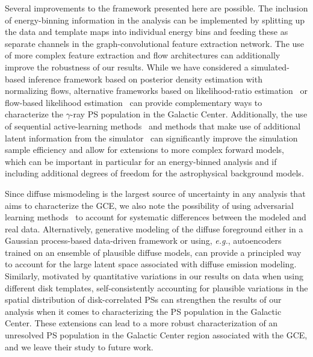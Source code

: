 \documentclass[prd,aps,10pt,nofootinbib,twocolumn,superscriptaddress,preprintnumbers,balancelastpage,longbibliography]{revtex4-1}
\begin{document}
Several improvements to the framework presented here are possible. The inclusion of energy-binning information in the analysis can be implemented by splitting up the data and template maps into individual energy bins and feeding these as separate channels in the graph-convolutional feature extraction network. The use of more complex feature extraction and flow architectures can additionally improve the robustness of our results. 
While we have considered a simulated-based inference framework based on posterior density estimation with normalizing flows, alternative frameworks based on likelihood-ratio estimation~\cite{Brehmer:2018eca,Brehmer:2018hga,Brehmer:2018kdj,Cranmer:2015bka, Hermans:2019ioj,Miller:2020hua,Miller:2021hys} or flow-based likelihood estimation~\cite{winkler2019learning,papamakarios2019sequential} can provide complementary ways to characterize the $\gamma$-ray PS population in the Galactic Center. Additionally, the use of sequential active-learning methods~\cite{papamakarios2019sequential} and methods that make use of additional latent information from the simulator~\cite{Brehmer:2018eca,Brehmer:2018hga,Brehmer:2018kdj,Brehmer:2019xox,Stoye:2018ovl} can significantly improve the simulation sample efficiency and allow for extensions to more complex forward models, which can be important in particular for an energy-binned analysis and if including additional degrees of freedom for the astrophysical background models. 

Since diffuse mismodeling is the largest source of uncertainty in any analysis that aims to characterize the GCE, we also note the possibility of using adversarial learning methods~\cite{Louppe:2016ylz} to account for systematic differences between the modeled and real \Fermi data. Alternatively, generative modeling of the diffuse foreground either in a Gaussian process-based data-driven framework or using, \emph{e.g.}, autoencoders trained on an ensemble of plausible diffuse models, can provide a principled way to account for the large latent space associated with diffuse emission modeling. Similarly, motivated by quantitative variations in our results on \Fermi data when using different disk templates, self-consistently accounting for plausible variations in the spatial distribution of disk-correlated PSs can strengthen the results of our analysis when it comes to characterizing the PS population in the Galactic Center. 
These extensions can lead to a more robust characterization of an unresolved PS population in the Galactic Center region associated with the GCE, and we leave their study to future work.
\end{document}

